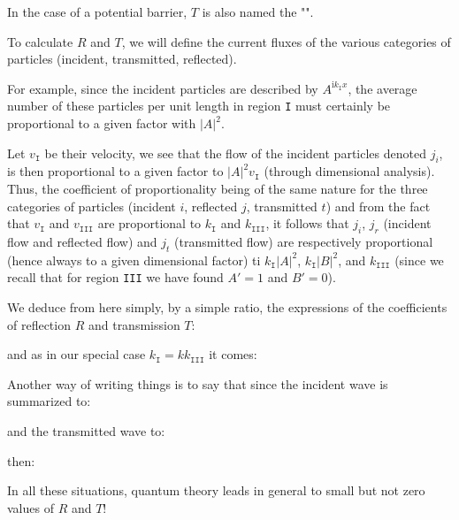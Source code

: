 	In the case of a potential barrier, $T$ is also named the "".

	To calculate $R$ and $T$, we will define the current fluxes of the various categories of particles (incident, transmitted, reflected).
	
	For example, since the incident particles are described by $A^{\mathrm{i}k_\texttt{I}x}$, the average number of these particles per unit length in region \texttt{I} must certainly be proportional to a given factor with $|A|^2$.
	
	Let $v_{\texttt{I}}$ be their velocity, we see that the flow of the incident particles denoted $j_i$, is then proportional to a given factor to $|A|^2v_{\texttt{I}}$ (through dimensional analysis). Thus, the coefficient of proportionality being of the same nature for the three categories of particles (incident $i$, reflected $j$, transmitted $t$) and from the fact that $v_{\texttt{I}}$ and $v_{\texttt{III}}$ are proportional to $k_{\texttt{I}}$ and $k_{\texttt{III}}$, it follows that $j_i$, $j_r$ (incident flow and reflected flow) and $j_t$ (transmitted flow) are respectively proportional (hence always to a given dimensional factor) ti $k_{\texttt{I}}|A|^2$, $k_{\texttt{I}}|B|^2$, and $k_{\texttt{III}}$ (since we recall that for region \texttt{III} we have found $A'=1$ and $B'=0$).
	
	We deduce from here simply, by a simple ratio, the expressions of the coefficients of reflection $R$ and transmission $T$:
	
	and as in our special case $k_{\texttt{I}}=kk_{\texttt{III}}$ it comes:
	
	Another way of writing things is to say that since the incident wave is summarized to:
	
	and the transmitted wave to:
	
	then:
	
	In all these situations, quantum theory leads in general to small but not zero values of $R$ and $T$!
	
